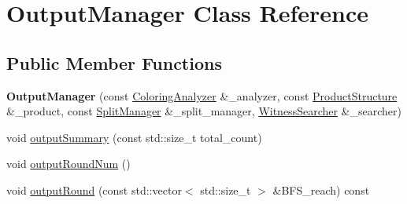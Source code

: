 \hypertarget{class_output_manager}{\section{Output\-Manager Class Reference}
\label{class_output_manager}
}
\subsection*{Public Member Functions}
\begin{DoxyCompactItemize}
\item 
\hypertarget{class_output_manager_ad59abcda2b87361fea6b19ba78c3ffc1}{{\bfseries Output\-Manager} (const \hyperlink{class_coloring_analyzer}{Coloring\-Analyzer} \&\-\_\-analyzer, const \hyperlink{class_product_structure}{Product\-Structure} \&\-\_\-product, const \hyperlink{class_split_manager}{Split\-Manager} \&\-\_\-split\-\_\-manager, \hyperlink{class_witness_searcher}{Witness\-Searcher} \&\-\_\-searcher)}\label{class_output_manager_ad59abcda2b87361fea6b19ba78c3ffc1}

\item 
void \hyperlink{class_output_manager_ad2fc6aa32779d30f69c600e5810126de}{output\-Summary} (const std\-::size\-\_\-t total\-\_\-count)
\item 
void \hyperlink{class_output_manager_aa3a6094bc7631bf8596fa29ff3e8e9e3}{output\-Round\-Num} ()
\item 
void \hyperlink{class_output_manager_ad3114797a216aa2d5039d5dacbbfbaa2}{output\-Round} (const std\-::vector$<$ std\-::size\-\_\-t $>$ \&B\-F\-S\-\_\-reach) const 
\end{DoxyCompactItemize}


